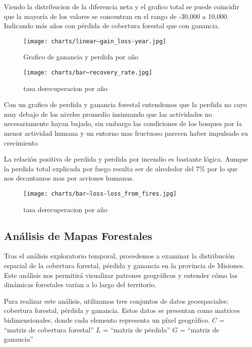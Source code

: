 \documentclass[11pt]{article}
\begin{document}
Viendo la distribucion de la diferencia neta y el grafico total se puede coincidir que la mayoría de los valores se concentran en el rango de -30,000 a 10,000. Indicando más años con pérdida de cobertura forestal que con ganancia.
\begin{figure}[H]
    \centering
    \texttt{[image: charts/linear--gain\_loss-year.jpg]}
    \caption{Grafico de ganancia y perdida por año}
    \label{fig:prom-emisiones-vehiculos-año}
\end{figure}
\begin{figure}[H]
    \centering
    \texttt{[image: charts/bar--recovery\_rate.jpg]}
    \caption{tasa derecuperacion por año}
    \label{fig:prom-emisiones-vehiculos-año}
\end{figure}

Con un grafico de perdida y ganancia forestal entendemos que la perdida no cayo muy debajo de los niveles promedio insinuando que las actividades no necesariamente hayan bajado, sin embargo las condiciones de los bosques por la menor actividad humana y un entorno mas fructuoso parecen haber impulsado su crecimiento

La relación positiva de perdida y perdida por incendio es bastante lógica. Aunque la perdida total explicada por fuego resulta ser de alrededor del 7\% por lo que nos decantamos mas por acciones humanas.

    \label{fig:prom-emisiones-vehiculos-año}
\begin{figure}[H]
    \centering
    \texttt{[image: charts/bar--loss-loss\_from\_fires.jpg]}
    \caption{tasa derecuperacion por año}
    \label{fig:prom-emisiones-vehiculos-año}
\end{figure}

\subsection{Análisis de Mapas Forestales} \label{tab: Analisis 2} 
Tras el análisis exploratorio temporal, procedemos a examinar la distribución espacial de la cobertura forestal, pérdida y ganancia en la provincia de Misiones. Este análisis nos permitirá visualizar patrones geográficos y entender cómo las dinámicas forestales varían a lo largo del territorio.

Para realizar este análisis, utilizamos tres conjuntos de datos geoespaciales: cobertura forestal, pérdida y ganancia. Estos datos se presentan como matrices bidimensionales, donde cada elemento representa un píxel geográfico. 
 $C$ = ``matriz de cobertura forestal'' 
 $L$ = ``matriz de pérdida''
 $G$ = ``matriz de ganancia'' 
\end{document}
